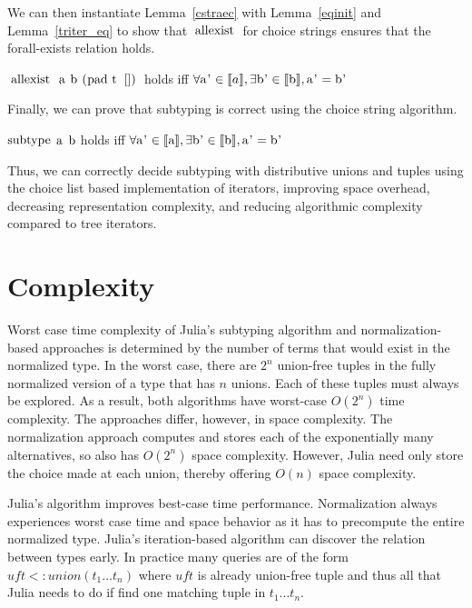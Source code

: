 \documentclass[a4paper,english]{lipics-v2019}
\newcommand{\denotes}[1]{\llbracket #1 \rrbracket}
\renewcommand{\c}[1]{\ensuremath{\text{\lstinline{#1}}}\xspace}
\begin{document}
\noindent We can then instantiate Lemma~\ref{cstraec} with Lemma~\ref{eqinit} and
Lemma~\ref{triter_eq} to show that \c{allexist} for choice strings ensures
that the forall-exists relation holds.
 
\begin{theorem}
\c{allexist a b (pad t [])} holds iff $\forall \c{a'} \in \denotes{a}, \exists \c{b'} \in \denotes{\c b}, \c{a'} = \c{b'}$
\end{theorem}

\noindent Finally, we can prove that subtyping is correct using the choice string algorithm.

\begin{theorem}\label{trsub}
\c{subtype} \c a \c b holds iff $\forall \c{a'} \in \denotes{\c a}, \exists \c{b'} \in \denotes{\c b}, \c{a'} = \c{b'}$
\end{theorem}

Thus, we can correctly decide subtyping with distributive unions and tuples
using the choice list based implementation of iterators, improving space overhead,
decreasing representation complexity, and reducing algorithmic complexity compared
to tree iterators. 

\section{Complexity}

Worst case time complexity of Julia's subtyping algorithm and
normalization-based approaches is determined by the number of terms that
would exist in the normalized type. In the worst case, there are $2^n$
union-free tuples in the fully normalized version of a type that has $n$
unions.  Each of these tuples must always be explored. As a result, both
algorithms have worst-case $O(2^n)$ time complexity. The approaches differ,
however, in space complexity. The normalization approach computes and stores
each of the exponentially many alternatives, so also has $O(2^n)$ space
complexity. However, Julia need only store the choice made at each union,
thereby offering $O(n)$ space complexity.

Julia's algorithm improves best-case time performance.  Normalization always
experiences worst case time and space behavior as it has to precompute the
entire normalized type. Julia's iteration-based algorithm can discover the
relation between types early. In practice many queries are of the form
$\mathit{uft} <: union(t_1...t_n)$ where $\mathit{uft}$ is already
union-free tuple and thus all that Julia needs to do if find one matching
tuple in $t_1 ... t_n$.
\end{document}
